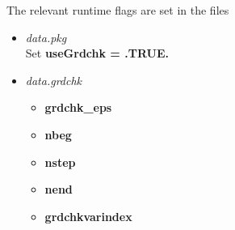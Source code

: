 The relevant runtime flags are set in the files
%
\begin{itemize}
%
\item {\it data.pkg} \\
Set {\bf useGrdchk = .TRUE.}
%
\item {\it data.grdchk}
%
\begin{itemize}
%
\item {\bf grdchk\_eps}
~
\item {\bf nbeg}
~
\item {\bf nstep}
~
\item {\bf nend}
~
\item {\bf grdchkvarindex}
~
%
\end{itemize}
%
\end{itemize}




